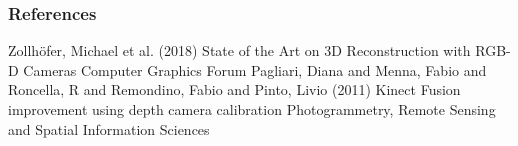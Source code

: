 \begin{frame}[allowframebreaks]
  \frametitle<presentation>{References}
  \begin{thebibliography}{1}
  \beamertemplatearticlebibitems
    Zollh{\"o}fer, Michael et al. (2018)
    \newblock State of the Art on 3D Reconstruction with RGB-D Cameras
    \newblock Computer Graphics Forum
      Pagliari, Diana and Menna, Fabio and Roncella, R and Remondino, Fabio and Pinto, Livio (2011)
      \newblock Kinect Fusion improvement using depth camera calibration
      \newblock Photogrammetry, Remote Sensing and Spatial Information Sciences

  \end{thebibliography}
\end{frame}
